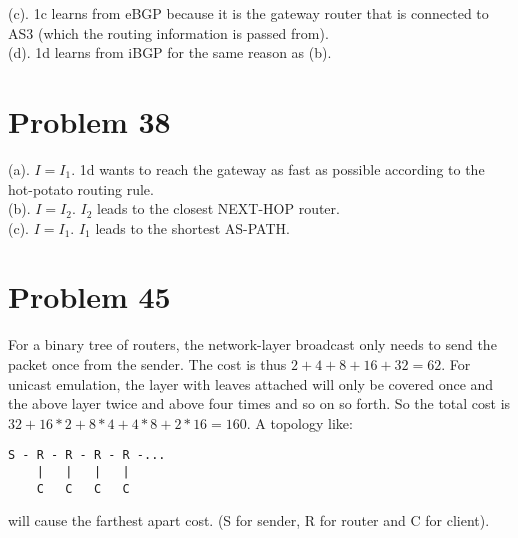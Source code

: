 \documentclass[titlepage, paper=a4, fontsize=11pt]{scrartcl} %
\numberwithin{equation}{section} %
\numberwithin{table}{section} %
\begin{document}
(c).
1c learns from eBGP because it is the gateway router that is connected to AS3 (which the routing information is passed from). \\

(d).
1d learns from iBGP for the same reason as (b). \\




\section*{Problem 38}
(a).
$I = I_1$. 1d wants to reach the gateway as fast as possible according to the hot-potato routing rule. \\

(b).
$I = I_2$. $I_2$ leads to the closest NEXT-HOP router. \\

(c).
$I = I_1$. $I_1$ leads to the shortest AS-PATH. \\




\section*{Problem 45}
For a binary tree of routers, the network-layer broadcast only needs to send the packet once from the sender. The cost is thus $2+4+8+16+32=62$. For unicast emulation, the layer with leaves attached will only be covered once and the above layer twice and above four times and so on so forth. So the total cost is $32+16*2+8*4+4*8+2*16=160$.
A topology like: \\
\begin{verbatim}
S - R - R - R - R -...
    |   |   |   |
    C   C   C   C
\end{verbatim}
will cause the farthest apart cost. (S for sender, R for router and C for client).
\end{document}
